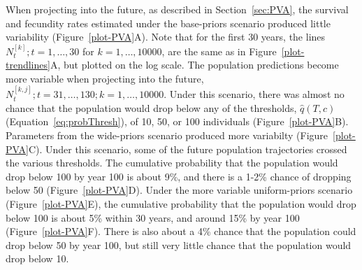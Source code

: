 \documentclass[]{risa}\usepackage[]{graphicx}\usepackage[]{color}
\begin{document}
When projecting into the future, as described in Section~\ref{sec:PVA}, the survival and fecundity rates estimated under the base-priors scenario produced little variability (Figure~\ref{plot-PVA}A). Note that for the first 30 years, the lines $N^{[k]}_t; t = 1,\ldots,30$ for $k = 1,\ldots,10000$, are the same as in Figure~\ref{plot-trendlines}A, but plotted on the log scale. The population predictions become more variable when projecting into the future, $N^{[k,j]}_t; t = 31,\ldots,130; k=1,\ldots,10000$. Under this scenario, there was almost no chance that the population would drop below any of the thresholds, $\hat{q}(T,c)$ (Equation~\ref{eq:probThresh}), of 10, 50, or 100 individuals (Figure~\ref{plot-PVA}B). Parameters from the wide-priors scenario produced more variabilty (Figure~\ref{plot-PVA}C). Under this scenario, some of the future population trajectories crossed the various thresholds. The cumulative probability that the population would drop below 100 by year 100 is about 9\%, and there is a 1-2\% chance of dropping below 50 (Figure~\ref{plot-PVA}D). Under the more variable uniform-priors scenario (Figure~\ref{plot-PVA}E), the cumulative probability that the population would drop below 100 is about 5\% within 30 years, and around 15\% by year 100 (Figure~\ref{plot-PVA}F).  There is also about a 4\% chance that the population could drop below 50 by year 100, but still very little chance that the population would drop below 10.
\end{document}
